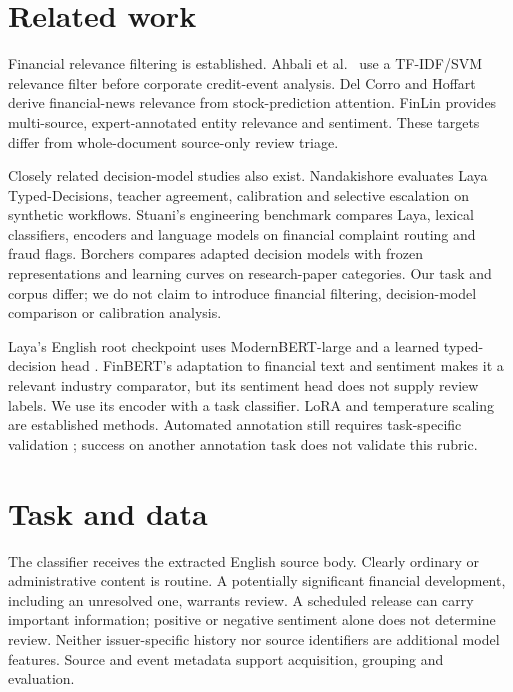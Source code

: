 \documentclass[11pt,a4paper]{article}
\begin{document}
\section{Related work}
Financial relevance filtering is established. Ahbali et al.\ \citep{credit}
use a TF-IDF/SVM relevance filter before corporate credit-event analysis.
Del Corro and Hoffart \citep{financialrelevance} derive financial-news relevance
from stock-prediction attention. FinLin \citep{finlin} provides multi-source,
expert-annotated entity relevance and sentiment. These targets differ from
whole-document source-only review triage.

Closely related decision-model studies also exist. Nandakishore
\citep{assessor} evaluates Laya Typed-Decisions, teacher agreement, calibration
and selective escalation on synthetic workflows. Stuani's engineering
benchmark \citep{complaints} compares Laya, lexical classifiers, encoders and
language models on financial complaint routing and fraud flags. Borchers
\citep{borchers} compares adapted decision models with frozen representations
and learning curves on research-paper categories. Our task and corpus differ;
we do not claim to introduce financial filtering, decision-model comparison
or calibration analysis.

Laya's English root checkpoint uses ModernBERT-large and a learned typed-decision
head \citep{laya,modernbert}. FinBERT's adaptation to financial text and sentiment
\citep{finbert} makes it a relevant industry comparator, but its sentiment head
does not supply review labels. We use its encoder with a task classifier.
LoRA \citep{lora} and temperature scaling \citep{guo} are established methods.
Automated annotation still requires task-specific validation \citep{annotation};
success on another annotation task does not validate this rubric.

\section{Task and data}
\label{sec:data}
The classifier receives the extracted English source body. Clearly ordinary or
administrative content is routine. A potentially significant financial development,
including an unresolved one, warrants review. A scheduled release can carry important
information; positive or negative sentiment alone does not determine review.
Neither issuer-specific history nor source identifiers are additional model features.
Source and event metadata support acquisition, grouping and evaluation.
\end{document}
